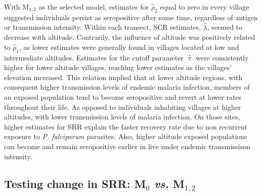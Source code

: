 With M$_{1,2}$ as the selected model, estimates for $ \widehat{\rho}_2$ equal to zero in every village suggested individuals persist as seropositive after some time, regardless of antigen or transmission intensity.
Within each transect, SCR estimates, $ \widehat{\lambda}$, seemed to decrease with altitude.
Contrarily, the influence of altitude was positively related to $ \widehat{\rho}_1$, as lower estimates were generally found in villages located at low and intermediate altitudes.
Estimates for the cutoff parameter $ \widehat{\uptau}$ were consistently higher for lower altitude villages, reaching lower estimates as the villages' elevation increased.
This relation implied that at lower altitude regions, with consequent higher transmission levels of endemic malaria infection, members of an exposed population tend to become seropositive and revert at lower rates throughout their life.
As opposed to individuals inhabiting villages at higher altitudes, with lower transmission levels of malaria infection.
On those sites, higher estimates for SRR explain the faster recovery rate due to non recurrent exposure to \textit{P. falciparum} parasites.
Also, higher altitude exposed populations can become and remain seropositive earlier in live under endemic transmissison intensity.


\subsection[Testing change in seroreversion rate]{Testing change in SRR: M$_{0}$ \textit{vs.} M$_{1,2}$}

